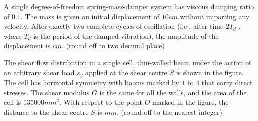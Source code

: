 	\item A single degree-of-freedom spring-mass-damper system has viscous damping ratio of $0.1$. The mass is given an initial displacement of $10 cm$ without imparting any velocity. After exactly two complete cycles of oscillation (i.e., after time $2T_d$ , where $T_d$ is the period of the damped vibration), the amplitude of the displacement is\underline{\hspace{2cm}} $cm$. (round off to two decimal place)
	
	\item The shear flow distribution in a single cell, thin-walled beam under the action of an arbitrary shear load $s_y$ applied at the shear centre $S$ is shown in the figure. The cell has horizontal symmetry with booms marked by $1$ to $4$ that carry direct stresses. The shear modulus $G$ is the same for all the walls, and the area of the cell is $135000 mm^2$. With respect to the point $O$ marked in the figure, the distance to the shear centre $S$ is \underline{\hspace{2cm}} $mm$. (round off to the nearest integer)\\
		\begin{center}
\end{center}



